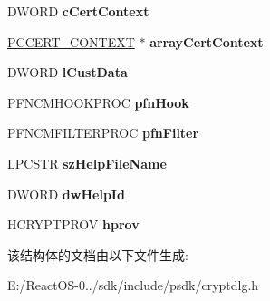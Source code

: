 \begin{DoxyCompactItemize}
\item 
\mbox{\label{structtag_c_s_s_a_a9db5b8810e687c06075062913c5f5ba5}} 
D\+W\+O\+RD {\bfseries c\+Cert\+Context}
\item 
\mbox{\label{structtag_c_s_s_a_a83201118ffc3884e586f6032826a136a}} 
\hyperlink{struct___c_e_r_t___c_o_n_t_e_x_t}{P\+C\+C\+E\+R\+T\+\_\+\+C\+O\+N\+T\+E\+XT} $\ast$ {\bfseries array\+Cert\+Context}
\item 
\mbox{\label{structtag_c_s_s_a_ac300405ace583ce5fe11e31ecbbac729}} 
D\+W\+O\+RD {\bfseries l\+Cust\+Data}
\item 
\mbox{\label{structtag_c_s_s_a_a1b23f75e1ec5e13c61c3dfc241c7868e}} 
P\+F\+N\+C\+M\+H\+O\+O\+K\+P\+R\+OC {\bfseries pfn\+Hook}
\item 
\mbox{\label{structtag_c_s_s_a_a50357ad30f5566209e26e50f8b0c954f}} 
P\+F\+N\+C\+M\+F\+I\+L\+T\+E\+R\+P\+R\+OC {\bfseries pfn\+Filter}
\item 
\mbox{\label{structtag_c_s_s_a_a3c603c56f1095214487fc0dfaca4877d}} 
L\+P\+C\+S\+TR {\bfseries sz\+Help\+File\+Name}
\item 
\mbox{\label{structtag_c_s_s_a_a54439b389fb7fd046b1b38709d2d8488}} 
D\+W\+O\+RD {\bfseries dw\+Help\+Id}
\item 
\mbox{\label{structtag_c_s_s_a_a96ccd091e306ac10f46cdc9965ed2c53}} 
H\+C\+R\+Y\+P\+T\+P\+R\+OV {\bfseries hprov}
\end{DoxyCompactItemize}


该结构体的文档由以下文件生成\+:\begin{DoxyCompactItemize}
\item 
E\+:/\+React\+O\+S-\/0../sdk/include/psdk/cryptdlg.\+h\end{DoxyCompactItemize}
